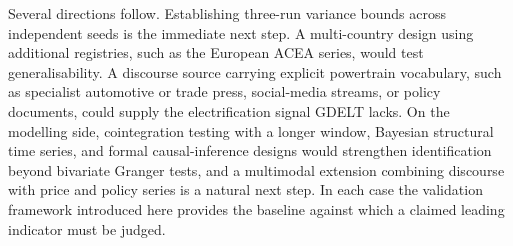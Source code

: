 \documentclass[conference]{IEEEtran}
\begin{document}
Several directions follow. Establishing three-run variance bounds across
independent seeds is the immediate next step. A multi-country design using
additional registries, such as the European ACEA series, would test
generalisability. A discourse source carrying explicit powertrain vocabulary,
such as specialist automotive or trade press, social-media streams, or policy
documents, could supply the electrification signal GDELT lacks. On the
modelling side, cointegration testing with a longer window, Bayesian structural
time series, and formal causal-inference designs would strengthen
identification beyond bivariate Granger tests, and a multimodal extension
combining discourse with price and policy series is a natural next step. In each
case the validation framework introduced here provides the baseline against
which a claimed leading indicator must be judged.
\end{document}
